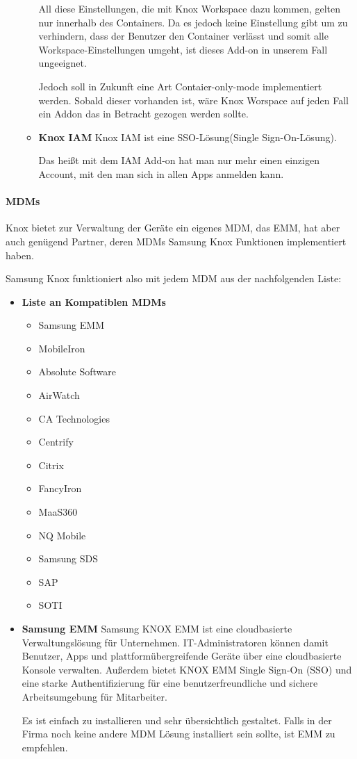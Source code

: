 \begin{itemize}
\begin{itemize}
\begin{itemize}
		\end{itemize}
	All diese Einstellungen, die mit Knox Workspace dazu kommen, gelten nur innerhalb des Containers. Da es jedoch keine Einstellung gibt um zu verhindern, dass der Benutzer den Container verlässt und somit alle Workspace-Einstellungen umgeht, ist dieses Add-on in unserem Fall ungeeignet. \par Jedoch soll in Zukunft eine Art Contaier-only-mode implementiert werden. Sobald dieser vorhanden ist, wäre Knox Worspace auf jeden Fall ein Addon das in Betracht gezogen werden sollte.
		\item \textbf{Knox IAM} \newline
		Knox IAM ist eine SSO-Lösung(Single Sign-On-Lösung). \par Das heißt mit dem IAM Add-on hat man nur mehr einen einzigen Account, mit den man sich in allen Apps anmelden kann.
	\end{itemize}
\end{itemize}
\paragraph{MDMs}
Knox bietet zur Verwaltung der Geräte ein eigenes MDM, das EMM, hat aber auch genügend Partner, deren MDMs Samsung Knox Funktionen implementiert haben. \par
Samsung Knox funktioniert also mit jedem MDM aus der nachfolgenden Liste:
\begin{itemize}
	\item \textbf{Liste an Kompatiblen MDMs}
	\begin{itemize}
		\item Samsung EMM
		\item MobileIron
		\item Absolute Software
		\item AirWatch
		\item CA Technologies
		\item Centrify
		\item Citrix
		\item FancyIron
		\item MaaS360
		\item NQ Mobile
		\item Samsung SDS
		\item SAP
		\item SOTI
	\end{itemize}
	\item \textbf{Samsung EMM} \newline
	Samsung KNOX EMM ist eine cloudbasierte Verwaltungslösung für Unternehmen. IT-Administratoren können damit Benutzer, Apps und plattformübergreifende Geräte über eine cloudbasierte Konsole verwalten. Außerdem bietet KNOX EMM Single Sign-On (SSO) und eine starke Authentifizierung für eine benutzerfreundliche und sichere Arbeitsumgebung für Mitarbeiter. \par Es ist einfach zu installieren und sehr übersichtlich gestaltet. Falls in der Firma noch keine andere MDM Lösung installiert sein sollte, ist EMM zu empfehlen.
\end{itemize}




